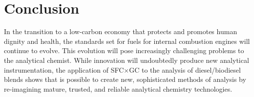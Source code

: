 \section{Conclusion}

In the transition to a low-carbon economy that protects and promotes human
dignity and health, the standards set for fuels for internal combustion engines
will continue to evolve. This evolution will pose increasingly challenging
problems to the analytical chemist. While innovation will undoubtedly produce
new analytical instrumentation, the application of SFC×GC to the analysis of
diesel/biodiesel blends shows that is possible to create new, sophisticated
methods of analysis by re-imagining mature, trusted, and reliable analytical
chemistry technologies.

